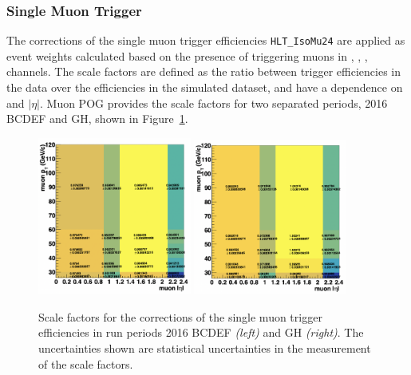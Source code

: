 \subsubsection{Single Muon Trigger}
The corrections of the single muon trigger efficiencies \texttt{HLT\_IsoMu24} are applied as event weights calculated based on the presence of triggering muons in \cme, \cmm, \cmt, \cmh channels. The scale factors are defined as the ratio between trigger efficiencies in the data over the efficiencies in the simulated dataset, and have a dependence on \pt and $|\eta|$. Muon POG provides the scale factors for two separated periods, 2016 BCDEF and GH, shown in Figure~\ref{fig:analysis:calibration:mu24TriggerSF}.
\begin{figure}
    \centering
    \includegraphics[width=0.45\textwidth]{chapters/Analysis/sectionCalibration/figures/trigger/muTrSF_BCDEF.png}
    \includegraphics[width=0.45\textwidth]{chapters/Analysis/sectionCalibration/figures/trigger/muTrSF_GH.png}
    \caption{Scale factors for the corrections of the single muon trigger efficiencies in run periods 2016 BCDEF \emph{(left)} and GH \emph{(right)}. The uncertainties shown are statistical uncertainties in the measurement of the scale factors.}
    \label{fig:analysis:calibration:mu24TriggerSF}
\end{figure}





